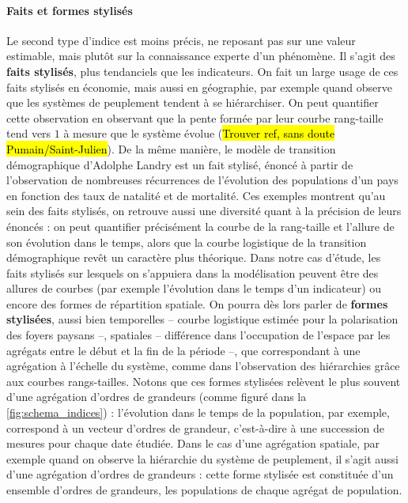 \paragraph{Faits et formes stylisés}
Le second type d'indice est moins précis, ne reposant pas sur une valeur estimable, mais plutôt sur la connaissance experte d'un phénomène.
Il s'agit des \og \textbf{faits stylisés}\fg{}\footnotemark{}, plus tendanciels que les indicateurs.
On fait un large usage de ces faits stylisés en économie, mais aussi en géographie, par exemple quand observe que les systèmes de peuplement tendent à se hiérarchiser.
On peut quantifier cette observation en observant que la pente formée par leur courbe rang-taille tend vers $1$ à mesure que le système évolue (\hl{Trouver ref, sans doute Pumain/Saint-Julien}).
De la même manière, le modèle de transition démographique d'Adolphe Landry est un fait stylisé, énoncé à partir de l'observation de nombreuses récurrences de l'évolution des populations d'un pays en fonction des taux de natalité et de mortalité.
Ces exemples montrent qu'au sein des faits stylisés, on retrouve aussi une diversité quant à la précision de leurs énoncés :
on peut quantifier précisément la courbe de la rang-taille et l'allure de son évolution dans le temps, alors que la courbe logistique de la transition démographique revêt un caractère plus théorique.
Dans notre cas d'étude, les faits stylisés sur lesquels on s'appuiera dans la modélisation peuvent être des allures de courbes (par exemple l'évolution dans le temps d'un indicateur) ou encore des formes de répartition spatiale.
On pourra dès lors parler de \og \textbf{formes stylisées}\fg{}, aussi bien temporelles -- courbe logistique estimée pour la polarisation des foyers paysans --, spatiales -- différence dans l'occupation de l'espace par les agrégats entre le début et la fin de la période --, que correspondant à une agrégation à l'échelle du système, comme dans l'observation des hiérarchies grâce aux courbes rangs-tailles.
Notons que ces formes stylisées relèvent le plus souvent d'une agrégation d'ordres de grandeurs (comme figuré dans la \cref{fig:schema_indices}) :
l'évolution dans le temps de la population, par exemple, correspond à un vecteur d'ordres de grandeur, c'est-à-dire à une succession de mesures pour chaque date étudiée.
Dans le cas d'une agrégation spatiale, par exemple quand on observe la hiérarchie du système de peuplement, il s'agit aussi d'une agrégation d'ordres de grandeurs :
cette forme stylisée est constituée d'un ensemble d'ordres de grandeurs, les populations de chaque agrégat de population.

